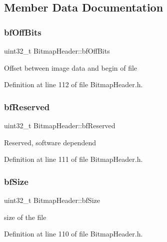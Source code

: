 \subsection{Member Data Documentation}
\mbox{\label{classBitmapHeader_a0b3470f079b95b2a6f053ad7d860ec06}} 
\subsubsection{\texorpdfstring{bfOffBits}{bfOffBits}}
{\footnotesize\ttfamily uint32\+\_\+t Bitmap\+Header\+::bf\+Off\+Bits\hspace{0.3cm}{\ttfamily [private]}}

Offset between image data and begin of file 

Definition at line 112 of file Bitmap\+Header.\+h.

\mbox{\label{classBitmapHeader_abb50b0ca8951540f0bec6fe21b0a7587}} 
\subsubsection{\texorpdfstring{bfReserved}{bfReserved}}
{\footnotesize\ttfamily uint32\+\_\+t Bitmap\+Header\+::bf\+Reserved\hspace{0.3cm}{\ttfamily [private]}}

Reserved, software dependend 

Definition at line 111 of file Bitmap\+Header.\+h.

\mbox{\label{classBitmapHeader_ac27568af32658738302d20edab99bb4b}} 
\subsubsection{\texorpdfstring{bfSize}{bfSize}}
{\footnotesize\ttfamily uint32\+\_\+t Bitmap\+Header\+::bf\+Size\hspace{0.3cm}{\ttfamily [private]}}

size of the file 

Definition at line 110 of file Bitmap\+Header.\+h.

